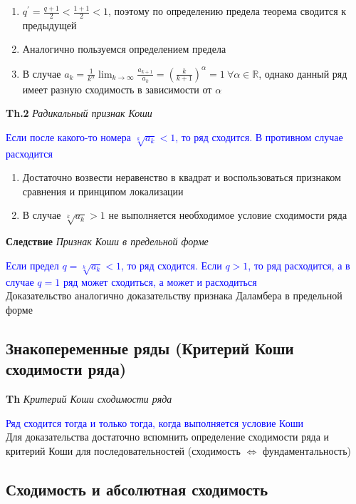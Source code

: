 \begin{enumerate}
    \item $q^{'} = \frac{q+1}{2} < \frac{1 + 1}{2} < 1$, поэтому по определению предела теорема сводится к
    предыдущей
    \item Аналогично пользуемся определением предела
    \item В случае $a_k = \frac{1}{k^{\alpha}} \lim_{k\to\infty} \frac{a_{k+1}}{a_k} = \left(\frac{k}{k+1}\right)^{\alpha} = 1~
    \forall \alpha \in \mathbb{R}$, однако данный ряд имеет разную сходимость в зависимости от $\alpha$
\end{enumerate}

\textbf{Th.2} \textit{Радикальный признак Коши}

\textcolor{blue}{Если после какого-то номера $\sqrt[k]{a_k} < 1$,
    то ряд сходится. В противном случае расходится}

\begin{enumerate}
    \item Достаточно возвести неравенство в квадрат и воспользоваться признаком сравнения и принципом локализации
    \item В случае $\sqrt[k]{a_k} > 1$ не выполняется необходимое условие сходимости ряда
\end{enumerate}

\textbf{Следствие} \textit{Признак Коши в предельной форме}

\textcolor{blue}{Если предел $q = \sqrt[k]{a_k} < 1$, то
ряд сходится. Если $q > 1$, то ряд расходится, а в случае $q = 1$ ряд может сходиться, а может и расходиться} \\

Доказательство аналогично доказательству признака Даламбера в предельной форме

\subsection{Знакопеременные ряды (Критерий Коши сходимости ряда)}

\textbf{Th} \textit{Критерий Коши сходимости ряда}

\textcolor{blue}{Ряд сходится тогда и только тогда, когда выполняется условие Коши} \\

Для доказательства достаточно вспомнить определение сходимости ряда и критерий Коши для последовательностей (сходимость $\Leftrightarrow$ фундаментальность)

\subsection{Сходимость и абсолютная сходимость}

